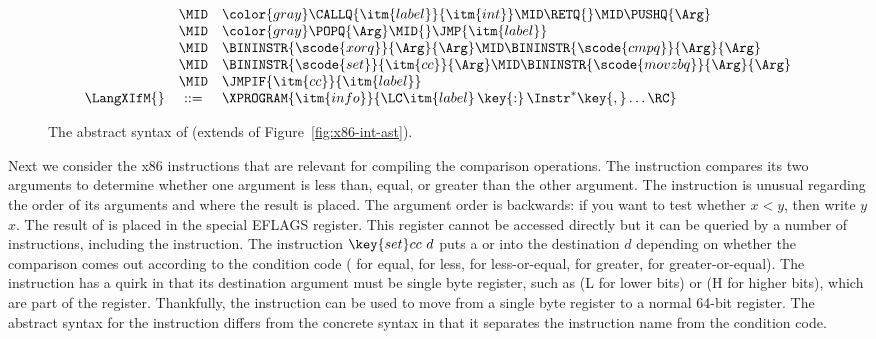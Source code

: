 \documentclass[7x10,nocrop]{TimesAPriori_MIT}%
\newcommand{\gray}[1]{{\color{gray} #1}}
\def\racketEd{0}
\def\pythonEd{1}
\def\edition{1}
\newcommand{\racket}[1]{{\if\edition\racketEd{#1}\fi}}
\newcommand{\python}[1]{{\if\edition\pythonEd #1\fi}}
\begin{document}
\begin{figure}[tp]
{\begin{minipage}{0.98\textwidth}
{\[\begin{array}{lcl}
       &\MID& \gray{ \CALLQ{\itm{label}}{\itm{int}} \MID \RETQ{} 
       \MID \PUSHQ{\Arg}} \\
       &\MID& \gray{ \POPQ{\Arg} \MID \racket{\JMP{\itm{label}}} } \python{\JMP{\itm{label}}}\\
       &\MID& \BININSTR{\scode{xorq}}{\Arg}{\Arg}
       \MID \BININSTR{\scode{cmpq}}{\Arg}{\Arg}\\
       &\MID& \BININSTR{\scode{set}}{\itm{cc}}{\Arg} 
       \MID \BININSTR{\scode{movzbq}}{\Arg}{\Arg}\\
       &\MID&  \JMPIF{\itm{cc}}{\itm{label}} \\
\LangXIfM{} &::= & \XPROGRAM{\itm{info}}{\LC\itm{label} \,\key{:}\, \Instr^{*} \key{,} \ldots \RC }
\end{array}
\]
\fi}
\end{minipage}
}
\caption{The abstract syntax of \LangXIf{} (extends \LangXInt{} of Figure~\ref{fig:x86-int-ast}).}
\label{fig:x86-1}
\end{figure}

Next we consider the x86 instructions that are relevant for compiling
the comparison operations. The  instruction compares its two
arguments to determine whether one argument is less than, equal, or
greater than the other argument. The  instruction is unusual
regarding the order of its arguments and where the result is
placed. The argument order is backwards: if you want to test whether
$x < y$, then write  $y$\code{,} $x$. The result of
 is placed in the special EFLAGS register. This register
cannot be accessed directly but it can be queried by a number of
instructions, including the  instruction. The instruction
$\key{set}cc~d$ puts a  or  into the destination $d$
depending on whether the comparison comes out according to the
condition code  ( for equal,  for less, 
for less-or-equal,  for greater,  for
greater-or-equal).  The  instruction has a quirk in
that its destination argument must be single byte register, such as
 (L for lower bits) or  (H for higher bits), which
are part of the  register.  Thankfully, the 
instruction can be used to move from a single byte register to a
normal 64-bit register.  The abstract syntax for the 
instruction differs from the concrete syntax in that it separates the
instruction name from the condition code.
\end{document}

